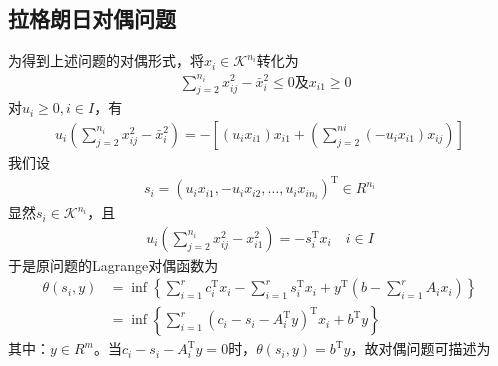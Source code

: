
    \subsection{拉格朗日对偶问题}
        \par
        为得到上述问题的对偶形式，将$x_i \in \mathcal{K}^{n_i}$转化为
        \begin{align*}
          & \mathop{\sum} \limits_{j=2}^{n_i}x_{ij}^2-{\bar{x}}_i^2\leqslant 0\text{及} x_{i1}\geqslant 0
        \end{align*}
        对$u_i\geqslant 0,i \in I$，有
        \begin{align*}
          u_i \left( \mathop{\sum} \limits_{j=2}^{n_i}x_{ij}^2-{\bar{x}}_i^2 \right) =-\left[(u_ix_{i1})x_{i1}+\left( \mathop{\sum} \limits_{j=2}^{ni}(-u_ix_{i1})x_{ij} \right) \right]
        \end{align*}
        我们设
        \begin{align*}
         s_i=(u_ix_{i1},-u_ix_{i2},\ldots,u_ix_{in_i})^\mathrm{T} \in R^{n_i}
        \end{align*}
        显然$s_i \in \mathcal{K}^{n_i}$，且
        \begin{align*}
         u_i \left( \mathop{\sum} \limits_{j=2}^{n_i}x_{ij}^2-x_{i1}^2 \right) =-s_i^\mathrm{T} x_i \quad i \in I
        \end{align*}
        于是原问题的Lagrange对偶函数为
        \begin{align*}
         \theta(s_i,y)&=\inf\left\{\mathop{\sum} \limits_{i=1}^{r}c_i^\mathrm{T} x_i-\mathop{\sum} \limits_{i=1}^{r}s_i^\mathrm{T} x_i+y^\mathrm{T} \left(b-\mathop{\sum} \limits_{i=1}^{r}A_ix_i\right)\right\}\\
         &=\inf\left\{\mathop{\sum} \limits_{i=1}^{r}(c_i-s_i-A_i^\mathrm{T} y)^\mathrm{T} x_i+b^\mathrm{T} y\right\}
        \end{align*}
        其中：$y \in R^m$。当$c_i-s_i-A_i^\mathrm{T} y=0$时，$\theta(s_i,y)=b^\mathrm{T} y$，故对偶问题可描述为
